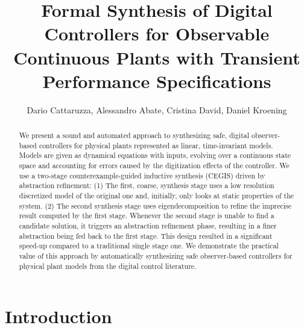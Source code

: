 \documentclass[sigconf]{llncs}
\begin{document}
\title{Formal Synthesis of Digital Controllers for Observable Continuous
Plants with Transient Performance Specifications}

\author{Dario Cattaruzza, Alessandro Abate, Cristina David, Daniel Kroening}%



\maketitle


\begin{abstract} 
%
We present a sound and automated approach to synthesizing safe,
digital observer-based controllers for physical plants represented as
linear, time-invariant models.  Models are given as dynamical
equations with inputs, evolving over a continuous state space and
accounting for errors caused by the digitization effects of the
controller.  We use a two-stage counterexample-guided inductive
synthesis (CEGIS) driven by abstraction refinement: (1) The first,
coarse, synthesis stage uses a low resolution discretized model of the
original one and, initially, only looks at static properties of the
system.  (2) The second synthesis stage uses eigendecomposition to
refine the imprecise result computed by the first stage.  Whenever the
second stage is unable to find a candidate solution, it triggers an
abstraction refinement phase, resulting in a finer abstraction being
fed back to the first stage.  This design resulted in a significant
speed-up compared to a traditional single stage one.  We demonstrate
the practical value of this approach by automatically synthesizing
safe observer-based controllers for physical plant models from the
digital control literature.
%
\end{abstract}

\section{Introduction}
\end{document}
